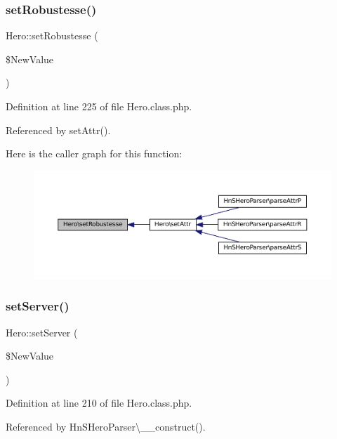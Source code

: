 \subsubsection{\texorpdfstring{set\+Robustesse()}{setRobustesse()}}
{\footnotesize\ttfamily Hero\+::set\+Robustesse (\begin{DoxyParamCaption}\item[{}]{\$\+New\+Value }\end{DoxyParamCaption})}



Definition at line 225 of file Hero.\+class.\+php.



Referenced by set\+Attr().

Here is the caller graph for this function\+:\nopagebreak
\begin{figure}[H]
\begin{center}
\leavevmode
\includegraphics[width=350pt]{class_hero_abfb17e0fc088df407d18bb6a83a5ee36_icgraph}
\end{center}
\end{figure}
\mbox{\label{class_hero_a4b70e6c2741977f8561adf943606bdea}} 
\subsubsection{\texorpdfstring{set\+Server()}{setServer()}}
{\footnotesize\ttfamily Hero\+::set\+Server (\begin{DoxyParamCaption}\item[{}]{\$\+New\+Value }\end{DoxyParamCaption})}



Definition at line 210 of file Hero.\+class.\+php.



Referenced by Hn\+S\+Hero\+Parser\textbackslash{}\+\_\+\+\_\+construct().

